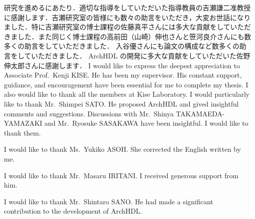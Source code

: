 研究を進めるにあたり．適切な指導をしていただいた指導教員の吉瀬謙二准教授に感謝します．吉瀬研究室の皆様にも数々の助言をいただき，大変お世話になりました．特に吉瀬研究室の博士課程の佐藤真平さんには多大な貢献をしていただきました．また同じく博士課程の高前田（山崎）伸也さんと笹河良介さんにも数多くの助言をしていただきました．
入谷優さんにも論文の構成など数多くの助言をしていただきました．
ArchHDL の開発に多大な貢献をしていただいた佐野伸太郎さんに感謝します．
\fi
I would like to express the deepest appreciation to Associate Prof.~Kenji KISE.\@
He has been my supervisor. His constant support, guidance, and encouragement have been essential for me to complete my thesis.
I also would like to thank all the members at Kise Laboratory.
I would particularly like to thank Mr.~Shimpei SATO.\@
He proposed ArchHDL and gived insightful comments and suggestions.
Discussions with Mr.~Shinya TAKAMAEDA-YAMAZAKI and Mr.~Ryosuke SASAKAWA have been insightful. I would like to thank them.

I would like to thank Ms.~Yukiko ASOH.\@
She corrected the English written by me.

I would like to thank Mr.~Masaru IRITANI.\@
I received generous support from him.

I would like to thank Mr.~Shintaro SANO.\@
He had made a significant contribution to the development of ArchHDL.

